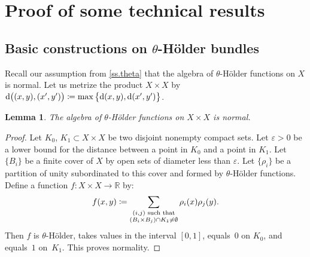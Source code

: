 \documentclass[JEP,XML,SOM,Unicode]{cedram}
\def\vcentcolon{\mathrel{\mathop\ordinarycolon}}
\providecommand\ordinarycolon{:}
\providecommand*\coloneqq{\vcentcolon\mathrel{\mkern-1.2mu}=}
\theoremstyle{plain}
\newtheorem{lemma}[theorem]{Lemma}
\theoremstyle{definition}
\newcommand{\RR}{\mathbb{R}}
\newcommand{\dd}{\mathrm{d}}
\let\epsilon\varepsilon
\begin{document}
\appendix

\section{Proof of some technical results}
\label{s.technical}

\subsection{Basic constructions on \texorpdfstring{$\theta$}{theta}-Hölder bundles}\label{ss.basic}

Recall our assumption from \cref{ss.theta} that the algebra of $\theta$-Hölder functions on $X$ is normal. Let us metrize the product $X \times X$ by $\dd\big( (x,y), (x',y') \big) \coloneqq \max\big\{ \dd(x,y), \dd(x',y') \big\}$.

\begin{lemma}\label{l.square}
The algebra of $\theta$-Hölder functions on $X \times X$ is normal.
\end{lemma}

\begin{proof}
Let $K_0$, $K_1 \subset X \times X$ be two disjoint nonempty compact sets.
Let $\epsilon>0$ be a lower bound for the distance between a point in $K_0$ and a point in $K_1$. Let $\{B_i\}$ be a finite cover of $X$ by open sets of diameter less than $\epsilon$. Let $\{\rho_i\}$ be a partition of unity subordinated to this cover and formed by $\theta$-Hölder functions. Define a function $f \colon X \times X \to \RR$ by:
\[
f(x,y) \coloneqq \sum_{\substack{(i,j) \text{ such that} \\ (B_i \times B_j)\cap K_1 \neq \emptyset}} \rho_i(x) \rho_j(y).
\]
Then $f$ is $\theta$-Hölder, takes values in the interval $[0,1]$, equals~$0$ on $K_0$, and equals~$1$ on~$K_1$. This proves normality.
\end{proof}
\end{document}
